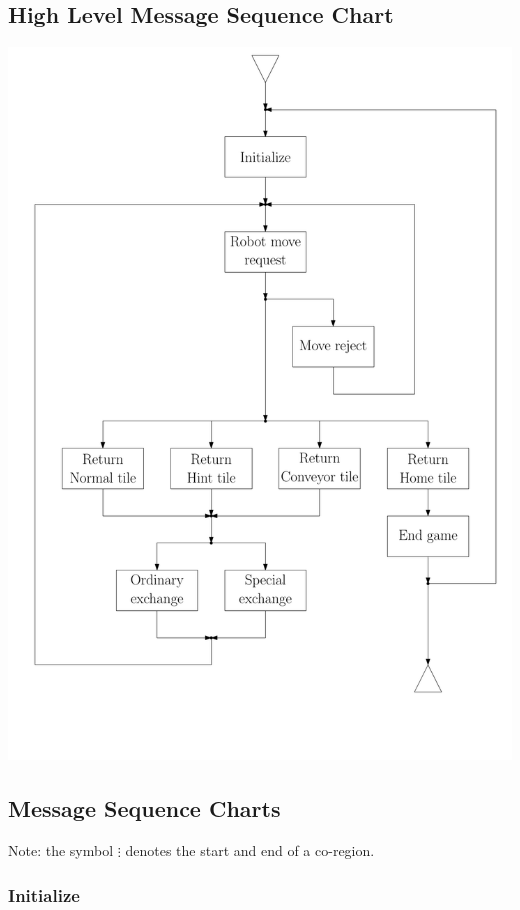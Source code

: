 \subsection{High Level Message Sequence Chart}
	\includegraphics[width=\linewidth,bb=0 0 680 1000]{MSC-files/HMSC.pdf}
	
\subsection{Message Sequence Charts}
	Note: the symbol $\vdots$ denotes the start and end of a co-region.

	\subsubsection{Initialize}
    
    	
